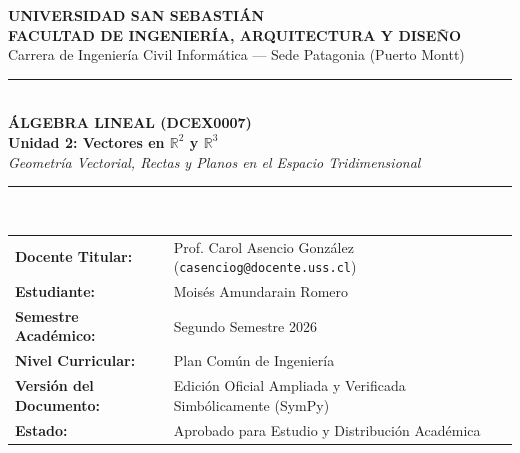 \documentclass[10pt,letterpaper]{article}
\begin{document}
\begin{titlepage}
    \centering
    \vspace*{0.5cm}
    {\Huge\bfseries\sffamily\color{USSBlue} UNIVERSIDAD SAN SEBASTIÁN}\\[0.3cm]
    {\large\sffamily\color{USSGold}\textbf{FACULTAD DE INGENIERÍA, ARQUITECTURA Y DISEÑO}}\\[0.2cm]
    {\normalsize\sffamily\color{USSDark} Carrera de Ingeniería Civil Informática --- Sede Patagonia (Puerto Montt)}\\[1.2cm]

    \rule{\linewidth}{1.5pt}\\[0.4cm]
    {\huge\bfseries\sffamily\color{USSBlue} ÁLGEBRA LINEAL (DCEX0007)}\\[0.3cm]
    {\Large\bfseries\sffamily\color{USSDark} Unidad 2: Vectores en $\mathbb{R}^2$ y $\mathbb{R}^3$}\\[0.2cm]
    {\large\itshape Geometría Vectorial, Rectas y Planos en el Espacio Tridimensional}\\[0.4cm]
    \rule{\linewidth}{1.5pt}\\[1.2cm]

    \begin{tcolorbox}[colback=USSBlueLight, colframe=USSBlue, width=0.92\linewidth, arc=2.5mm, boxrule=1pt]
        \centering\sffamily
        \begin{tabular}{ll}
            \textbf{Docente Titular:} & Prof. Carol Asencio González (\texttt{casenciog@docente.uss.cl}) \\
            \textbf{Estudiante:} & Moisés Amundarain Romero \\
            \textbf{Semestre Académico:} & Segundo Semestre 2026 \\
            \textbf{Nivel Curricular:} & Plan Común de Ingeniería \\
            \textbf{Versión del Documento:} & Edición Oficial Ampliada y Verificada Simbólicamente (SymPy) \\
            \textbf{Estado:} & Aprobado para Estudio y Distribución Académica
        \end{tabular}
    \end{tcolorbox}

    \vspace{0.8cm}


\end{titlepage}
\end{document}
